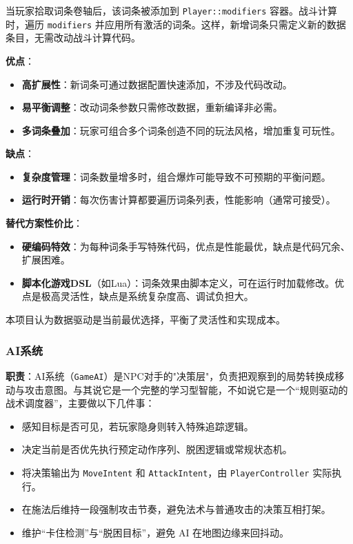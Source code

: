 ﻿\documentclass[utf8]{ctexart}
\begin{document}
当玩家拾取词条卷轴后，该词条被添加到 \texttt{Player::modifiers} 容器。战斗计算时，遍历 \texttt{modifiers} 并应用所有激活的词条。这样，新增词条只需定义新的数据条目，无需改动战斗计算代码。

\textbf{优点}：

\begin{itemize}
  \item \textbf{高扩展性}：新词条可通过数据配置快速添加，不涉及代码改动。
  \item \textbf{易平衡调整}：改动词条参数只需修改数据，重新编译非必需。
  \item \textbf{多词条叠加}：玩家可组合多个词条创造不同的玩法风格，增加重复可玩性。
\end{itemize}

\textbf{缺点}：

\begin{itemize}
  \item \textbf{复杂度管理}：词条数量增多时，组合爆炸可能导致不可预期的平衡问题。
  \item \textbf{运行时开销}：每次伤害计算都要遍历词条列表，性能影响（通常可接受）。
\end{itemize}

\textbf{替代方案性价比}：

\begin{itemize}
  \item \textbf{硬编码特效}：为每种词条手写特殊代码，优点是性能最优，缺点是代码冗余、扩展困难。
  \item \textbf{脚本化游戏DSL}（如Lua）：词条效果由脚本定义，可在运行时加载修改。优点是极高灵活性，缺点是系统复杂度高、调试负担大。
\end{itemize}

本项目认为数据驱动是当前最优选择，平衡了灵活性和实现成本。

\subsubsection{AI系统}

\textbf{职责}：AI系统（\texttt{GameAI}）是NPC对手的"决策层"，负责把观察到的局势转换成移动与攻击意图。与其说它是一个完整的学习型智能，不如说它是一个“规则驱动的战术调度器”，主要做以下几件事：

\begin{itemize}
  \item 感知目标是否可见，若玩家隐身则转入特殊追踪逻辑。
  \item 决定当前是否优先执行预定动作序列、脱困逻辑或常规状态机。
  \item 将决策输出为 \texttt{MoveIntent} 和 \texttt{AttackIntent}，由 \texttt{PlayerController} 实际执行。
  \item 在施法后维持一段强制攻击节奏，避免法术与普通攻击的决策互相打架。
  \item 维护“卡住检测”与“脱困目标”，避免 AI 在地图边缘来回抖动。
\end{itemize}
\end{document}
